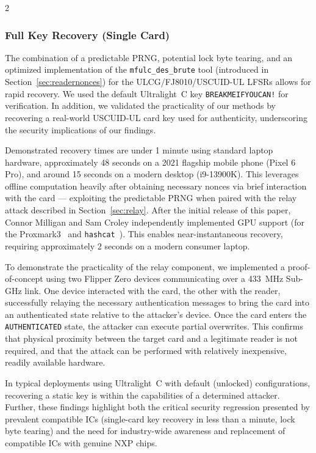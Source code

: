 \documentclass[10pt,letterpaper]{article}
\begin{document}
\begin{multicols}{2}
\subsubsection*{Full Key Recovery (Single Card)} 
The combination of a predictable PRNG, potential lock byte tearing, and an optimized implementation of the \texttt{mfulc\_des\_brute} tool (introduced in Section~\ref{sec:readernonces}) for the ULCG/FJ8010/USCUID-UL LFSRs allows for rapid recovery. We used the default Ultralight~C key \texttt{BREAKMEIFYOUCAN!} for verification. In addition, we validated the practicality of our methods by recovering a real-world USCUID-UL card key used for authenticity, underscoring the security implications of our findings.

Demonstrated recovery times are under 1 minute using standard laptop hardware, approximately 48 seconds on a 2021 flagship mobile phone (Pixel 6 Pro), and around 15 seconds on a modern desktop (i9-13900K). This leverages offline computation heavily after obtaining necessary nonces via brief interaction with the card --- exploiting the predictable PRNG when paired with the relay attack described in Section~\ref{sec:relay}.
After the initial release of this paper, Connor Milligan and Sam Croley independently implemented GPU support (for the Proxmark3~\cite{cuda_des_brute} and \texttt{hashcat}~\cite{hashcat_des_brute}). This enables near-instantaneous recovery, requiring approximately 2 seconds on a modern consumer laptop.

To demonstrate the practicality of the relay component, we implemented a proof-of-concept using two Flipper Zero devices communicating over a 433~MHz Sub-GHz link. One device interacted with the card, the other with the reader, successfully relaying the necessary authentication messages to bring the card into an authenticated state relative to the attacker's device. Once the card enters the \texttt{AUTHENTICATED} state, the attacker can execute partial overwrites. This confirms that physical proximity between the target card and a legitimate reader is not required, and that the attack can be performed with relatively inexpensive, readily available hardware.

In typical deployments using Ultralight~C with default (unlocked) configurations, recovering a static key is within the capabilities of a determined attacker. Further, these findings highlight both the critical security regression presented by prevalent compatible ICs (single-card key recovery in less than a minute, lock byte tearing) and the need for industry-wide awareness and replacement of compatible ICs with genuine NXP chips.


\end{multicols}
\end{document}
